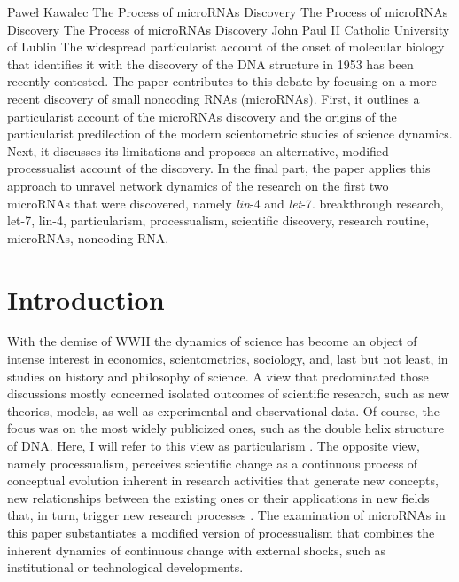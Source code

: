 \begin{artengenv}{Paweł Kawalec}
	{The Process of microRNAs Discovery}
	{The Process of microRNAs Discovery}
	{The Process of microRNAs Discovery}
	{John Paul II Catholic University of Lublin}
	{The widespread particularist account of the onset of molecular biology that identifies it with the discovery of the DNA structure in 1953 has been recently contested. The paper contributes to this debate by focusing on a more recent discovery of small noncoding RNAs (microRNAs). First, it outlines a particularist account of the microRNAs discovery and the origins of the particularist predilection of the modern scientometric studies of science dynamics. Next, it discusses its limitations and proposes an alternative, modified processualist account of the discovery. In the final part, the paper applies this approach to unravel network dynamics of the research on the first two microRNAs that were discovered, namely \textit{lin}-4 and \textit{let}-7.
	}
	{breakthrough research, let-7, lin-4, particularism, processualism, scientific discovery, research routine, microRNAs, noncoding RNA.}


\section{Introduction}
With the demise of WWII the dynamics of science has become an object of intense interest in economics, scientometrics, sociology, and, last but not least, in studies on history and philosophy of science. A view that predominated those discussions mostly concerned isolated outcomes of scientific research, such as new theories, models, as well as experimental and observational data. Of course, the focus was on the most widely publicized ones, such as the double helix structure of DNA. Here, I will refer to this view as particularism
\parencite[][]{giovagnoli_cognitive_2020}. %
 The opposite view, namely processualism, perceives scientific change as a continuous process of conceptual evolution inherent in research activities that generate new concepts, new relationships between the existing ones or their applications in new fields that, in turn, trigger new research processes 
\parencite[][]{nicholson_everything_2018}. %
 The examination of microRNAs in this paper substantiates a modified version of processualism that combines the inherent dynamics of continuous change with external shocks, such as institutional or technological developments.


\end{artengenv}
